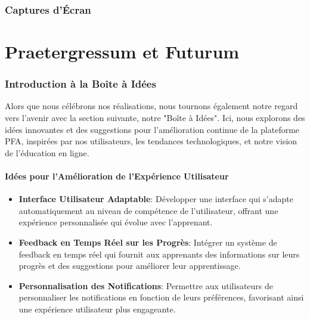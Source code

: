 \section{Captures d'Écran}


\newpage

\part{Praetergressum et Futurum}

\section{Introduction à la Boîte à Idées}

\label{part:ideabox}
Alors que nous célébrons nos réalisations, nous tournons également notre regard vers l'avenir avec la section suivante, notre "Boîte à Idées". Ici, nous explorons des idées innovantes et des suggestions pour l'amélioration continue de la plateforme PFA, inspirées par nos utilisateurs, les tendances technologiques, et notre vision de l'éducation en ligne.

\subsection{Idées pour l'Amélioration de l'Expérience Utilisateur}
\begin{itemize}[leftmargin=*,label=\textbullet,font=\color{violet}]
    \item \textbf{Interface Utilisateur Adaptable}: Développer une interface qui s'adapte automatiquement au niveau de compétence de l'utilisateur, offrant une expérience personnalisée qui évolue avec l'apprenant.
    \item \textbf{Feedback en Temps Réel sur les Progrès}: Intégrer un système de feedback en temps réel qui fournit aux apprenants des informations sur leurs progrès et des suggestions pour améliorer leur apprentissage.
    \item \textbf{Personnalisation des Notifications}: Permettre aux utilisateurs de personnaliser les notifications en fonction de leurs préférences, favorisant ainsi une expérience utilisateur plus engageante.
\end{itemize}


